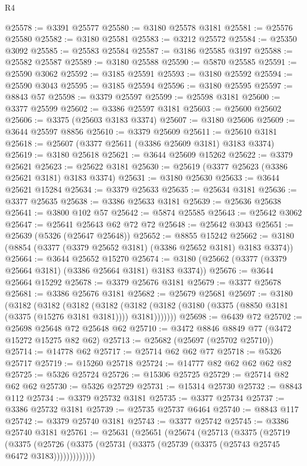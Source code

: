 \begin{lexlean}{R4}
\begin{coremodule}
@25578 := @3391 @25577
@25580 := @3180 @25578 @3181
@25581 := @25576 @25580
@25582 := @3180 @25581
@25583 := @3212 @25572
@25584 := @25350 @3092
@25585 := @25583 @25584
@25587 := @3186 @25585 @3197
@25588 := @25582 @25587
@25589 := @3180 @25588
@25590 := @5870 @25585
@25591 := @25590 @3062
@25592 := @3185 @25591
@25593 := @3180 @25592
@25594 := @25590 @3043
@25595 := @3185 @25594
@25596 := @3180 @25595
@25597 := @8843 @57
@25598 := @3379 @25597
@25599 := @25598 @3181
@25600 := @3377 @25599
@25602 := @3386 @25597 @3181
@25603 := @25600 @25602
@25606 := @3375 (@25603 @3183 @3374)
@25607 := @3180 @25606
@25609 := @3644 @25597 @8856
@25610 := @3379 @25609
@25611 := @25610 @3181
@25618 := @25607 (@3377 @25611 (@3386 @25609 @3181) @3183 @3374)
@25619 := @3180 @25618
@25621 := @3644 @25609 @15262
@25622 := @3379 @25621
@25623 := @25622 @3181
@25630 := @25619 (@3377 @25623 (@3386 @25621 @3181) @3183 @3374)
@25631 := @3180 @25630
@25633 := @3644 @25621 @15284
@25634 := @3379 @25633
@25635 := @25634 @3181
@25636 := @3377 @25635
@25638 := @3386 @25633 @3181
@25639 := @25636 @25638
@25641 := @3800 @102 @57
@25642 := @5874 @25585
@25643 := @25642 @3062
@25647 := @25641 @25643 @62 @72 @72
@25648 := @25642 @3043
@25651 := @25639 (@5326 (@25647 @25648))
@25652 := @8855 @15242
@25662 := @3180 (@8854 (@3377 (@3379 @25652 @3181) (@3386 @25652 @3181) @3183 @3374))
@25664 := @3644 @25652 @15270
@25674 := @3180 (@25662 (@3377 (@3379 @25664 @3181) (@3386 @25664 @3181) @3183 @3374))
@25676 := @3644 @25664 @15292
@25678 := @3379 @25676 @3181
@25679 := @3377 @25678
@25681 := @3386 @25676 @3181
@25682 := @25679 @25681
@25697 := @3180
    (@3182
      (@3182
        (@3182
          (@3182
            (@3182 (@3182 (@3180 (@3375 (@8850 @3181 (@3375 (@15276 @3181 @3181)))) @3181)))))))
@25698 := @6439 @72
@25702 := @25698 @25648 @72 @25648 @62
@25710 := @3472 @8846 @8849 @77 (@3472 @15272 @15275 @82 @62)
@25713 := @25682 (@25697 (@25702 @25710))
@25714 := @14778 @62
@25717 := @25714 @62 @62 @77
@25718 := @5326 @25717
@25719 := @15260 @25718
@25724 := @14777 @82 @62 @62 @62 @82
@25725 := @5326 @25724
@25726 := @15306 @25725
@25729 := @25714 @82 @62 @62
@25730 := @5326 @25729
@25731 := @15314 @25730
@25732 := @8843 @112
@25734 := @3379 @25732 @3181
@25735 := @3377 @25734
@25737 := @3386 @25732 @3181
@25739 := @25735 @25737 @6464
@25740 := @8843 @117
@25742 := @3379 @25740 @3181
@25743 := @3377 @25742
@25745 := @3386 @25740 @3181
@25761 := @25631
    (@25651
      (@25674
        (@25713
          (@3375
            (@25719
              (@3375
                (@25726 (@3375 (@25731 (@3375 (@25739 (@3375 (@25743 @25745 @6472 @3183)))))))))))))

\end{coremodule}
\end{lexlean}
